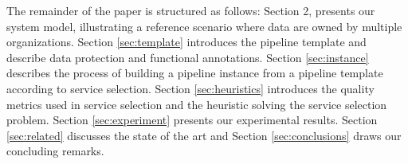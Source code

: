 The remainder of the paper is structured as follows: Section 2, presents our system model, illustrating a reference scenario where data are owned by multiple organizations. Section \ref{sec:template} introduces the pipeline template and describe data protection and functional annotations. Section \ref{sec:instance} describes the process of building a pipeline instance from a pipeline template according to service selection. Section \ref{sec:heuristics} introduces the quality metrics used in service selection and the heuristic solving the service selection problem. Section \ref{sec:experiment} presents our experimental results. Section \ref{sec:related} discusses the state of the art and Section \ref{sec:conclusions} draws our concluding remarks.
